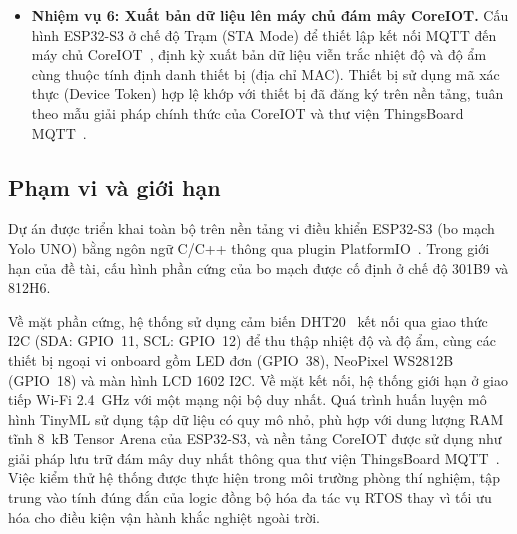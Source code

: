 \begin{itemize}
    \item \textbf{Nhiệm vụ 6: Xuất bản dữ liệu lên máy chủ đám mây CoreIOT.}
    Cấu hình ESP32-S3 ở chế độ Trạm (STA Mode) để thiết lập kết nối MQTT đến máy chủ CoreIOT~\cite{coreiot}, định kỳ xuất bản dữ liệu viễn trắc nhiệt độ và độ ẩm cùng thuộc tính định danh thiết bị (địa chỉ MAC).
    Thiết bị sử dụng mã xác thực (Device Token) hợp lệ khớp với thiết bị đã đăng ký trên nền tảng, tuân theo mẫu giải pháp chính thức của CoreIOT và thư viện ThingsBoard MQTT~\cite{thingsboard_mqtt}.
\end{itemize}

\subsection{Phạm vi và giới hạn}

Dự án được triển khai toàn bộ trên nền tảng vi điều khiển ESP32-S3 (bo mạch Yolo UNO) bằng ngôn ngữ C/C++ thông qua plugin PlatformIO~\cite{platformio}. Trong giới hạn của đề tài, cấu hình phần cứng của bo mạch được cố định ở chế độ 301B9 và 812H6.

Về mặt phần cứng, hệ thống sử dụng cảm biến DHT20~\cite{dht20} kết nối qua giao thức I2C (SDA: GPIO~11, SCL: GPIO~12) để thu thập nhiệt độ và độ ẩm, cùng các thiết bị ngoại vi onboard gồm LED đơn (GPIO~38), NeoPixel WS2812B~\cite{ws2812b} (GPIO~18) và màn hình LCD 1602 I2C.
Về mặt kết nối, hệ thống giới hạn ở giao tiếp Wi-Fi 2.4~GHz với một mạng nội bộ duy nhất.
Quá trình huấn luyện mô hình TinyML sử dụng tập dữ liệu có quy mô nhỏ, phù hợp với dung lượng RAM tĩnh 8~kB Tensor Arena của ESP32-S3, và nền tảng CoreIOT được sử dụng như giải pháp lưu trữ đám mây duy nhất thông qua thư viện ThingsBoard MQTT~\cite{thingsboard_mqtt}.
Việc kiểm thử hệ thống được thực hiện trong môi trường phòng thí nghiệm, tập trung vào tính đúng đắn của logic đồng bộ hóa đa tác vụ RTOS thay vì tối ưu hóa cho điều kiện vận hành khắc nghiệt ngoài trời.
